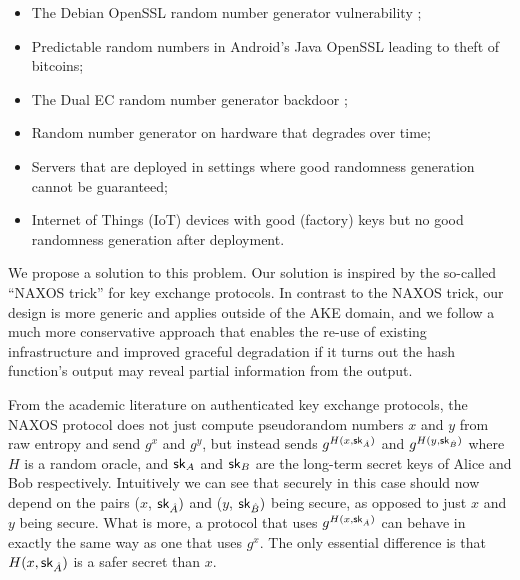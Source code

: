 \documentclass[12pt]{article}
\begin{document}
\begin{itemize}
\item The Debian OpenSSL random number generator vulnerability \cite{DebianRNGflaw, DebianRNGflawTLSDHE};

\item Predictable random numbers in Android's Java OpenSSL \cite{MarvinGoogle2013} leading to theft of bitcoins;

\item The Dual EC random number generator backdoor \cite{DualECstandardisedbackdoor};

\item Random number generator on hardware that degrades over time;

\item Servers that are deployed in settings where good randomness generation cannot be guaranteed;

\item Internet of Things (IoT) devices with good (factory) keys but no good randomness generation after deployment.
\end{itemize}

We propose a solution to this problem. Our solution is inspired by the
so-called ``NAXOS trick'' for key exchange protocols. In contrast to the
NAXOS trick, our design is more generic and applies outside of the AKE
domain, and we follow a much more conservative approach that enables the
re-use of existing infrastructure and improved graceful degradation if
it turns out the hash function's output may reveal partial information
from the output.

From the academic literature on authenticated key exchange protocols, the NAXOS protocol \cite{LaMacchiaeCK2007} does not just compute pseudorandom numbers $x$ and $y$ from raw entropy and send $g^{x}$ and $g^{y}$, but instead sends $g^{H(x, \mathsf{sk}_{\hat A})}$ and $g^{H(y, \mathsf{sk}_{\hat B})}$ where $H$ is a random oracle, and $\mathsf{sk}_{A}$ and $\mathsf{sk}_{B}$ are the long-term secret keys of Alice and Bob respectively. Intuitively we can see that securely in this case should now depend on the pairs ($x$, $\mathsf{sk}_{\hat A})$ and ($y$, $\mathsf{sk}_{\hat B})$ being secure, as opposed to just $x$ and $y$ being secure. What is more, a protocol that uses $g^{H(x, \mathsf{sk}_{\hat A})}$ can behave in exactly the same way as one that uses $g^x$. The only essential difference is that $H(x, \mathsf{sk}_{\hat A})$ is a safer secret than $x$.
\end{document}
